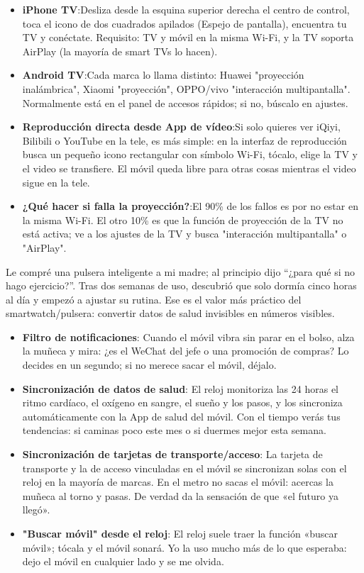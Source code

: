 \begin{itemize}
  \item \textbf{iPhone TV}:Desliza desde la esquina superior derecha el centro de control, toca el icono de dos cuadrados apilados (Espejo de pantalla), encuentra tu TV y conéctate. Requisito: TV y móvil en la misma Wi-Fi, y la TV soporta AirPlay (la mayoría de smart TVs lo hacen).
  \item \textbf{Android TV}:Cada marca lo llama distinto: Huawei "proyección inalámbrica", Xiaomi "proyección", OPPO/vivo "interacción multipantalla". Normalmente está en el panel de accesos rápidos; si no, búscalo en ajustes.
  \item \textbf{Reproducción directa desde App de vídeo}:Si solo quieres ver iQiyi, Bilibili o YouTube en la tele, es más simple: en la interfaz de reproducción busca un pequeño icono rectangular con símbolo Wi-Fi, tócalo, elige la TV y el video se transfiere. El móvil queda libre para otras cosas mientras el video sigue en la tele.
  \item \textbf{¿Qué hacer si falla la proyección?}:El 90\% de los fallos es por no estar en la misma Wi-Fi. El otro 10\% es que la función de proyección de la TV no está activa; ve a los ajustes de la TV y busca "interacción multipantalla" o "AirPlay".
\end{itemize}


Le compré una pulsera inteligente a mi madre; al principio dijo “¿para qué si no hago ejercicio?”. Tras dos semanas de uso, descubrió que solo dormía cinco horas al día y empezó a ajustar su rutina. Ese es el valor más práctico del smartwatch/pulsera: convertir datos de salud invisibles en números visibles.

\begin{itemize}
  \item \textbf{Filtro de notificaciones}: Cuando el móvil vibra sin parar en el bolso, alza la muñeca y mira: ¿es el WeChat del jefe o una promoción de compras? Lo decides en un segundo; si no merece sacar el móvil, déjalo.
  \item \textbf{Sincronización de datos de salud}: El reloj monitoriza las 24 horas el ritmo cardíaco, el oxígeno en sangre, el sueño y los pasos, y los sincroniza automáticamente con la App de salud del móvil. Con el tiempo verás tus tendencias: si caminas poco este mes o si duermes mejor esta semana.
  \item \textbf{Sincronización de tarjetas de transporte/acceso}: La tarjeta de transporte y la de acceso vinculadas en el móvil se sincronizan solas con el reloj en la mayoría de marcas. En el metro no sacas el móvil: acercas la muñeca al torno y pasas. De verdad da la sensación de que «el futuro ya llegó».
  \item \textbf{"Buscar móvil" desde el reloj}: El reloj suele traer la función «buscar móvil»; tócala y el móvil sonará. Yo la uso mucho más de lo que esperaba: dejo el móvil en cualquier lado y se me olvida.
\end{itemize}

